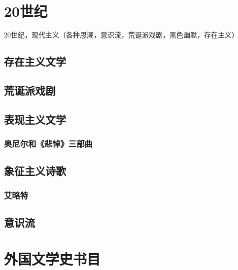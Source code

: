\documentclass[UTF8]{../../RepresentationUniverse}
\begin{document}
\chapter{20世纪}


20世纪，现代主义（各种思潮，意识流，荒诞派戏剧，黑色幽默，存在主义）



\section{存在主义文学}


\section{荒诞派戏剧}



\section{表现主义文学}

\subsection{奥尼尔和《悲悼》三部曲}



\section{象征主义诗歌}
\subsection{艾略特}




\section{意识流}




\chapter{外国文学史书目}
\end{document}
